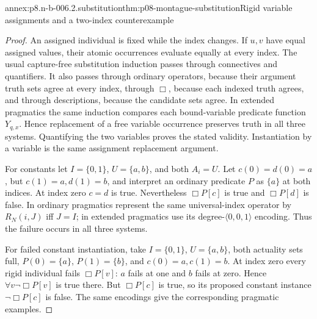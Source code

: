 \begin{annexitem}{annex:p8.n-b-006.2.substitution}{thm:p08-montague-substitution}{Rigid variable assignments and a two-index counterexample}
\begin{proof}
An assigned individual is fixed while the index changes. If \(u,v\)
have equal assigned values, their atomic occurrences evaluate equally
at every index. The usual capture-free substitution induction passes
through connectives and quantifiers. It also passes through ordinary
operators, because their argument truth sets agree at every index,
through \(\Box\), because each indexed truth agrees, and through
descriptions, because the candidate sets agree. In extended pragmatics
the same induction compares each bound-variable predicate function
\(Y_{q,x}\). Hence replacement of a free variable occurrence preserves
truth in all three systems. Quantifying the two variables proves the
stated validity. Instantiation by a variable is the same assignment
replacement argument.

For constants let \(I=\{0,1\}\), \(U=\{a,b\}\), and both
\(A_i=U\). Let \(c(0)=d(0)=a\), but \(c(1)=a,d(1)=b\), and
interpret an ordinary predicate \(P\) as \(\{a\}\) at both indices.
At index zero \(c=d\) is true. Nevertheless \(\Box P[c]\) is true
and \(\Box P[d]\) is false. In ordinary pragmatics represent the
same universal-index operator by \(R_N(i,J)\) iff \(J=I\); in
extended pragmatics use its degree-\(\langle0,0,1\rangle\) encoding.
Thus the failure occurs in all three systems.

For failed constant instantiation, take \(I=\{0,1\}\),
\(U=\{a,b\}\), both actuality sets full, \(P(0)=\{a\}\),
\(P(1)=\{b\}\), and \(c(0)=a,c(1)=b\).
At index zero every rigid individual fails \(\Box P[v]\):
\(a\) fails at one and \(b\) fails at zero. Hence
\(\forall v\neg\Box P[v]\) is true there. But \(\Box P[c]\)
is true, so its proposed constant instance \(\neg\Box P[c]\) is
false. The same encodings give the corresponding pragmatic examples.
\end{proof}
\end{annexitem}


